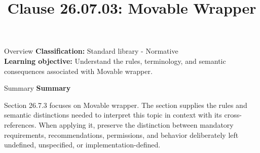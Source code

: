 \documentclass[10pt,letterpaper]{article}
\title{Clause 26.07.03: Movable Wrapper}
\author{}
\date{}
\begin{document}
\maketitle
\begin{CornellOverviewBox}{Overview}
\textbf{Classification:} Standard library - Normative\\[2pt]
\textbf{Learning objective:} Understand the rules, terminology, and semantic consequences associated with Movable wrapper.
\end{CornellOverviewBox}\begin{CornellSummaryBox}{Summary}
{\sffamily\bfseries\color{Accent} Summary}\par\vspace{3pt}Section 26.7.3 focuses on Movable wrapper. The section supplies the rules and semantic distinctions needed to interpret this topic in context with its cross-references. When applying it, preserve the distinction between mandatory requirements, recommendations, permissions, and behavior deliberately left undefined, unspecified, or implementation-defined.
\end{CornellSummaryBox}
\end{document}

